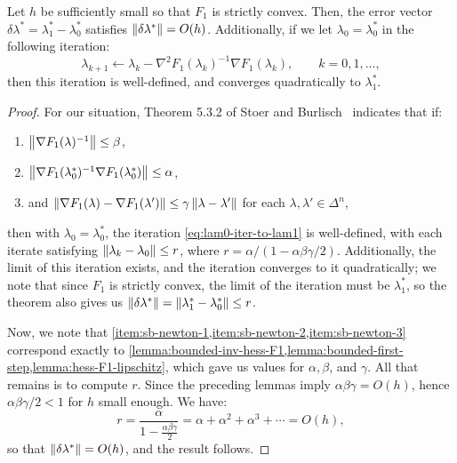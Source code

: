 \documentclass[eikonal.tex]{subfiles}
\begin{document}
\begin{theorem}\label{theorem:mp0-newton}
  Let $h$ be sufficiently small so that $F_1$ is strictly
  convex. Then, the error vector
  $\delta\lambda^* = \lambda_1^* - \lambda_0^*$ satisfies
  $\left\|\delta\lambda^*\right\| = O(h)$. Additionally, if we let
  $\lambda_0 = \lambda_0^*$ in the following iteration:
  \begin{equation}
    \label{eq:lam0-iter-to-lam1}
    \lambda_{k+1} \gets \lambda_k - \nabla^2 F_1(\lambda_k)^{-1} \nabla F_1(\lambda_k), \qquad k = 0, 1, \hdots,
  \end{equation}
  then this iteration is well-defined, and converges quadratically to
  $\lambda_1^*$.
\end{theorem}

\begin{proof}
  For our situation, Theorem 5.3.2 of Stoer and
  Burlisch~\cite{stoer2013introduction} indicates that if:
  \begin{enumerate}
  \item $\left\|\nabla F_1(\lambda)^{-1}\right\| \leq \beta$,\label{item:sb-newton-1}
  \item $\left\|\nabla F_1(\lambda_0^*)^{-1} \nabla F_1(\lambda_0^*)\right\| \leq \alpha$,\label{item:sb-newton-2}
  \item and
    $\left\|\nabla F_1(\lambda) - \nabla F_1(\lambda')\right\| \leq \gamma
    \left\|\lambda - \lambda'\right\|$ for each
    $\lambda, \lambda' \in \Delta^n$,\label{item:sb-newton-3}
  \end{enumerate}
  then with $\lambda_0 = \lambda_0^*$, the iteration
  \cref{eq:lam0-iter-to-lam1} is well-defined, with each iterate
  satisfying $\left\|\lambda_k - \lambda_0\right\| \leq r$, where
  $r = \alpha/(1 - \alpha\beta\gamma/2)$. Additionally, the limit of
  this iteration exists, and the iteration converges to it
  quadratically; we note that since $F_1$ is strictly convex, the
  limit of the iteration must be $\lambda_1^*$, so the theorem also
  gives us
  $\left\|\delta\lambda^*\right\| = \left\|\lambda_1^* - \lambda_0^*\right\| \leq r$.

  Now, we note that
  \cref{item:sb-newton-1,item:sb-newton-2,item:sb-newton-3} correspond
  exactly to
  \cref{lemma:bounded-inv-hess-F1,lemma:bounded-first-step,lemma:hess-F1-lipschitz},
  which gave us values for $\alpha, \beta$, and $\gamma$. All that
  remains is to compute $r$. Since the preceding lemmas imply
  $\alpha\beta\gamma = O(h)$, hence $\alpha\beta\gamma/2 < 1$ for $h$
  small enough. We have:
  \begin{equation}
    r = \frac{\alpha}{1 - \frac{\alpha\beta\gamma}{2}} = \alpha + \alpha^2 + \alpha^3 + \cdots = O(h),
  \end{equation}
  so that $\left\|\delta\lambda^*\right\| = O(h)$, and the result follows.
\end{proof}
\end{document}

